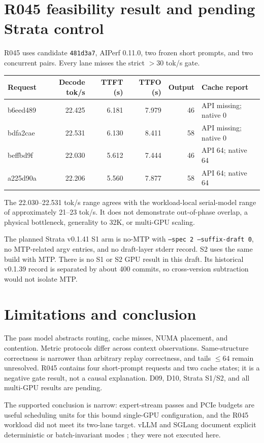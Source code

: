 \documentclass[11pt]{article}
\begin{document}
\section{R045 feasibility result and pending Strata control}
R045 uses candidate \texttt{481d3a7}, AIPerf 0.11.0, two frozen short prompts, and two concurrent pairs. Every lane misses the strict $>30$ tok/s gate.
\begin{center}
\begin{tabular}{lrrrrl}
\toprule
Request & Decode tok/s & TTFT (s) & TTFO (s) & Output & Cache report \\
\midrule
b6eed489 & 22.425 & 6.181 & 7.979 & 46 & API missing; native 0 \\
bdfa2cae & 22.531 & 6.130 & 8.411 & 58 & API missing; native 0 \\
beffbd9f & 22.030 & 5.612 & 7.444 & 46 & API 64; native 64 \\
a225d90a & 22.206 & 5.560 & 7.877 & 58 & API 64; native 64 \\
\bottomrule
\end{tabular}
\end{center}
The 22.030--22.531 tok/s range agrees with the workload-local serial-model range of approximately 21--23 tok/s. It does not demonstrate out-of-phase overlap, a physical bottleneck, generality to 32K, or multi-GPU scaling.

The planned Strata v0.1.41 S1 arm is no-MTP with \texttt{--spec 2 --suffix-draft 0}, no MTP-related argv entries, and no draft-layer stderr record. S2 uses the same build with MTP. There is no S1 or S2 GPU result in this draft. Its historical v0.1.39 record is separated by about 400 commits, so cross-version subtraction would not isolate MTP.

\section{Limitations and conclusion}
The pass model abstracts routing, cache misses, NUMA placement, and contention. Metric protocols differ across context observations. Same-structure correctness is narrower than arbitrary replay correctness, and tails $\leq64$ remain unresolved. R045 contains four short-prompt requests and two cache states; it is a negative gate result, not a causal explanation. D09, D10, Strata S1/S2, and all multi-GPU results are pending.

The supported conclusion is narrow: expert-stream passes and PCIe budgets are useful scheduling units for this bound single-GPU configuration, and the R045 workload did not meet its two-lane target. vLLM and SGLang document explicit deterministic or batch-invariant modes \cite{vllmrepro,vllmbatch,sglang}; they were not executed here.



\end{document}
